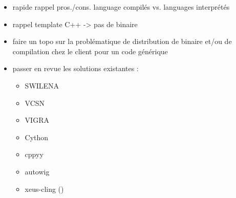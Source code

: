 \begin{itemize}
  \item rapide rappel pros./cons. language compilés vs. languages interprétés
  \item rappel template C++ -> pas de binaire
  \item faire un topo sur la problématique de distribution de binaire et/ou de compilation chez le client pour un code générique
  \item passer en revue les solutions existantes :
        \begin{itemize}
          \item SWILENA
          \item VCSN
          \item VIGRA
          \item Cython
          \item cppyy
          \item autowig
          \item xeus-cling ()
        \end{itemize}
\end{itemize}
